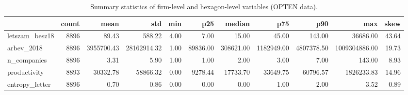 \begin{table}
\caption{Summary statistics of firm-level and hexagon-level variables (OPTEN data).}
\label{tab:opten_summary}
\begin{tabular}{lrrrrrrrrrr}
\toprule
 & count & mean & std & min & p25 & median & p75 & p90 & max & skew \\
\midrule
letszam\_besz18 & 8896 & 89.43 & 588.22 & 4.00 & 7.00 & 15.00 & 45.00 & 143.00 & 36686.00 & 43.64 \\
arbev\_2018 & 8896 & 3955700.43 & 28162914.32 & 1.00 & 89836.00 & 308621.00 & 1182949.00 & 4807378.50 & 1009304886.00 & 19.73 \\
n\_companies & 8896 & 3.31 & 5.90 & 1.00 & 1.00 & 2.00 & 3.00 & 7.00 & 143.00 & 8.93 \\
productivity & 8893 & 30332.78 & 58866.32 & 0.00 & 9278.44 & 17733.70 & 33649.75 & 60796.57 & 1826233.83 & 14.96 \\
entropy\_letter & 8896 & 0.70 & 0.86 & 0.00 & 0.00 & 0.00 & 1.00 & 2.00 & 3.52 & 0.89 \\
\bottomrule
\end{tabular}
\end{table}
